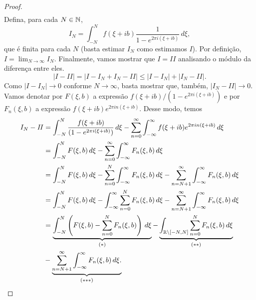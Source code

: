 \begin{proof}
\begin{align*}
        \end{align*}
        Defina, para cada $N\in \mathbb{N}$,
        \begin{equation*}
            I_N = \int_{-N}^{N}f(\xi + ib)\frac{1}{1 - e^{2\pi i(\xi + ib)}} \, d\xi,
        \end{equation*}
        que é finita para cada $N$ (basta estimar $I_N$ como estimamos $I$).
        Por definição, $I = \displaystyle{\lim_{N\to\infty} I_N}$. 
        Finalmente, vamos mostrar que $I = \mathit{II}$ 
        analisando o módulo da diferença entre eles.
        \begin{equation*}
            |I - \mathit{II}|  = |I - I_N + I_N - \mathit{II}| 
                               \leq |I-I_N| + |I_N - \mathit{II}|.
        \end{equation*}
        Como $|I - I_N| \to 0$ conforme $N \to \infty$, basta mostrar que, também, 
        $|I_N - \mathit{II}| \to 0$. Vamos denotar por $F(\xi,b)$ a expressão 
        $f(\xi + ib)/(1 - e^{2\pi i(\xi + ib)})$ e por $F_n(\xi,b)$ a expressão 
        $f(\xi + ib)e^{2\pi in(\xi + ib)}$. Desse modo, temos
        \begin{align*}
            I_N - \mathit{II} &= \int_{-N}^{N} \frac{f(\xi + ib)}{(1 - e^{2\pi i(\xi + ib)})}
            \, d\xi - \sum_{n=0}^{\infty}\int_{-\infty}^{\infty} f(\xi + ib)
            e^{2\pi in(\xi + ib)} \, d\xi \\
            &=\int_{-N}^{N} F(\xi,b) \, d\xi -
            \sum_{n=0}^{\infty}\int_{-\infty}^{\infty}F_n(\xi,b) \, d\xi \\
            &= \int_{-N}^{N} F(\xi,b) \, d\xi - 
            \sum_{n=0}^{N}\int_{-\infty}^{\infty}F_n(\xi,b) \, d\xi - 
            \sum_{n= N+1}^{\infty}\int_{-\infty}^{\infty}F_n(\xi,b) \, d\xi\\
            &= \int_{-N}^{N} F(\xi,b) \, d\xi - \int_{-\infty}^{\infty} 
            \sum_{n=0}^{N}F_n(\xi,b) \, d\xi - 
            \sum_{n= N+1}^{\infty}\int_{-\infty}^{\infty}F_n(\xi,b) \, d\xi\\
            &= \underbrace{\int_{-N}^{N} \left(F(\xi,b) - \sum_{n=0}^{N}F_n(\xi,b) 
            \right)\, d\xi}_{(*)} - 
            \underbrace{\int_{\mathbb{R} \setminus [-N,N]}\sum_{n=0}^{N}F_n(\xi,b) 
            \, d\xi}_{(**)} \\ &- 
            \underbrace{\sum_{n= N+1}^{\infty}\int_{-\infty}^{\infty}F_n(\xi,b) 
            \, d\xi.}_{(***)}
        \end{align*}

\end{proof}
